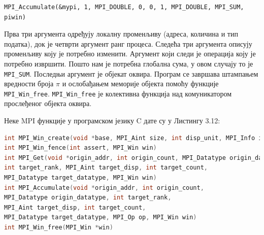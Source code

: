 \begin{verbatim}
MPI_Accumulate(&mypi, 1, MPI_DOUBLE, 0, 0, 1, MPI_DOUBLE, MPI_SUM, piwin)
\end{verbatim}

Прва три аргумента одређују локалну променљиву (адреса, количина и тип податка), док је четврти аргумент ранг процеса. Следећа три аргумента описују променљиву коју је потребно изменити.
Аргумент који следи је операција коју је потребно извршити. Пошто нам је потребна глобална сума, у овом случају то је \texttt{MPI\_SUM}. Последњи аргумент је објекат оквира.
Програм се завршава штампањем вредности броја $\pi$ и ослобађањем меморије објекта помоћу функције  \texttt{MPI\_Win\_free}.  \texttt{MPI\_Win\_free} је колективна функција над комуникатором прослеђеног објекта оквира.


Неке MPI функције у програмском језику C дате су у Листингу 3.12:

\begin{lstlisting}[style=nonumbers,frame=single,language=C, caption= MPI функције]
int MPI_Win_create(void *base, MPI_Aint size, int disp_unit, MPI_Info info,MPI_Comm comm, MPI_Win *win)
int MPI_Win_fence(int assert, MPI_Win win)
int MPI_Get(void *origin_addr, int origin_count, MPI_Datatype origin_datatype,
int target_rank, MPI_Aint target_disp, int target_count,
MPI_Datatype target_datatype, MPI_Win win)
int MPI_Accumulate(void *origin_addr, int origin_count,
MPI_Datatype origin_datatype, int target_rank,
MPI_Aint target_disp, int target_count,
MPI_Datatype target_datatype, MPI_Op op, MPI_Win win)
int MPI_Win_free(MPI_Win *win)
\end{lstlisting}

